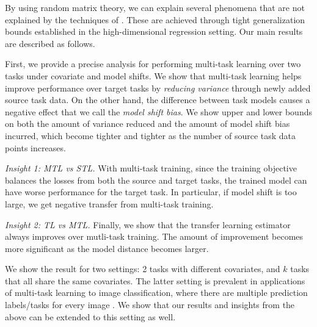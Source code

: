 By using random matrix theory, we can explain several phenomena that are not explained by the techniques of \cite{WZR20}.
These are achieved through tight generalization bounds established in the high-dimensional regression setting.
Our main results are described as follows.

\smallskip
{}
	First, we provide a precise analysis for performing multi-task learning over two tasks under covariate and model shifts.
	We show that multi-task learning helps improve performance over target tasks by \textit{reducing variance} through newly added source task data.
	On the other hand, the difference between task models causes a negative effect that we call the \textit{model shift bias}.
	We show upper and lower bounds on both the amount of variance reduced and the amount of model shift bias incurred, which become tighter and tighter as the number of source task data points increases.

	{\it Insight 1: MTL vs STL.} With multi-task training, since the training objective balances the losses from both the source and target tasks, the trained model can have worse performance for the target task.
	In particular, if model shift is too large, we get negative transfer from multi-task training.

	{\it Insight 2: TL vs MTL.} Finally, we show that the transfer learning estimator always improves over mutli-task training.
		The amount of improvement becomes more significant as the model distance becomes larger.

	We show the result for two settings: 2 tasks with different covariates, and $k$ tasks that all share the same covariates.
	The latter setting is prevalent in applications of multi-task learning to image classification, where there are multiple prediction labels/tasks for every image \cite{EA20}.
	We show that our results and insights from the above can be extended to this setting as well.



